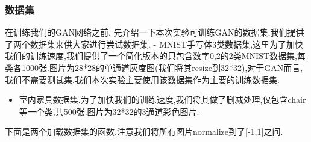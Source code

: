 \documentclass[11pt]{article}
\providecommand{\tightlist}{%
      \setlength{\itemsep}{0pt}\setlength{\parskip}{0pt}}
\begin{document}
    \hypertarget{ux6570ux636eux96c6}{%
\subsubsection{数据集}\label{ux6570ux636eux96c6}}

在训练我们的GAN网络之前,
先介绍一下本次实验可训练GAN的数据集,我们提供了两个数据集来供大家进行尝试数据集.
-
MNIST手写体3类数据集,这里为了加快我们的训练速度,我们提供了一个简化版本的只包含数字0,2的2类MNIST数据集,每类各1000张.图片为28*28的单通道灰度图(我们将其resize到32*32),对于GAN而言,我们不需要测试集.我们本次实验主要使用该数据集作为主要的训练数据集.

\begin{itemize}
\tightlist
\item
  室内家具数据集.为了加快我们的训练速度,我们将其做了删减处理,仅包含chair等一个类,共500张.图片为32*32的3通道彩色图片.
\end{itemize}

下面是两个加载数据集的函数.注意我们将所有图片normalize到了{[}-1,1{]}之间.
\end{document}
